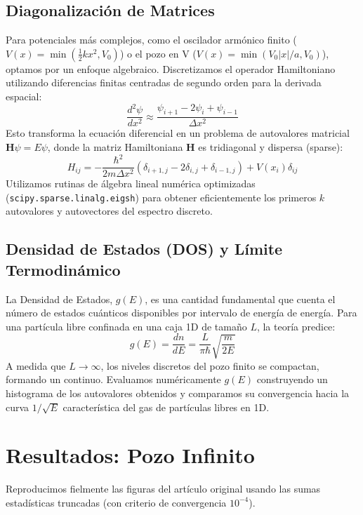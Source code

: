 \documentclass[twocolumn,superscriptaddress,prl,10pt]{revtex4-2}
\begin{document}
\subsection{Diagonalización de Matrices}
Para potenciales más complejos, como el oscilador armónico finito ($V(x)=\min(\frac{1}{2}kx^2, V_0)$) o el pozo en V ($V(x)=\min(V_0|x|/a, V_0)$), optamos por un enfoque algebraico. Discretizamos el operador Hamiltoniano utilizando diferencias finitas centradas de segundo orden para la derivada espacial:
\begin{equation}
\frac{d^2\psi}{dx^2} \approx \frac{\psi_{i+1} - 2\psi_i + \psi_{i-1}}{\Delta x^2}
\end{equation}
Esto transforma la ecuación diferencial en un problema de autovalores matricial $\mathbf{H}\psi = E\psi$, donde la matriz Hamiltoniana $\mathbf{H}$ es tridiagonal y dispersa (sparse):
\begin{equation}
H_{ij} = -\frac{\hbar^2}{2m\Delta x^2}(\delta_{i+1,j} - 2\delta_{i,j} + \delta_{i-1,j}) + V(x_i)\delta_{ij}
\end{equation}
Utilizamos rutinas de álgebra lineal numérica optimizadas (\texttt{scipy.sparse.linalg.eigsh}) para obtener eficientemente los primeros $k$ autovalores y autovectores del espectro discreto.

\subsection{Densidad de Estados (DOS) y Límite Termodinámico}
La Densidad de Estados, $g(E)$, es una cantidad fundamental que cuenta el número de estados cuánticos disponibles por intervalo de energía de energía. Para una partícula libre confinada en una caja 1D de tamaño $L$, la teoría predice:
\begin{equation}
g(E) = \frac{dn}{dE} = \frac{L}{\pi\hbar}\sqrt{\frac{m}{2E}}
\end{equation}
A medida que $L \to \infty$, los niveles discretos del pozo finito se compactan, formando un continuo. Evaluamos numéricamente $g(E)$ construyendo un histograma de los autovalores obtenidos y comparamos su convergencia hacia la curva $1/\sqrt{E}$ característica del gas de partículas libres en 1D.


\section{Resultados: Pozo Infinito}

Reproducimos fielmente las figuras del artículo original usando las sumas estadísticas truncadas (con criterio de convergencia $10^{-4}$).
\end{document}
